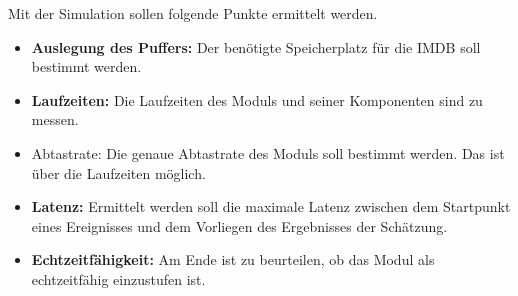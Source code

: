 
Mit der Simulation sollen folgende Punkte ermittelt werden.

\begin{itemize}
    \item \textbf{Auslegung des Puffers:} Der benötigte Speicherplatz für die \gls{IMDB} soll bestimmt werden.
    \item \textbf{Laufzeiten:} Die Laufzeiten des Moduls und seiner Komponenten sind zu messen.
    \item Abtastrate:\textbf{} Die genaue Abtastrate des Moduls soll bestimmt werden. Das ist über die Laufzeiten möglich.
    \item \textbf{Latenz:} Ermittelt werden soll die maximale Latenz zwischen dem Startpunkt eines Ereignisses und dem Vorliegen des Ergebnisses der Schätzung.
    \item \textbf{Echtzeitfähigkeit:} Am Ende ist zu beurteilen, ob das Modul als echtzeitfähig einzustufen ist.
\end{itemize}
